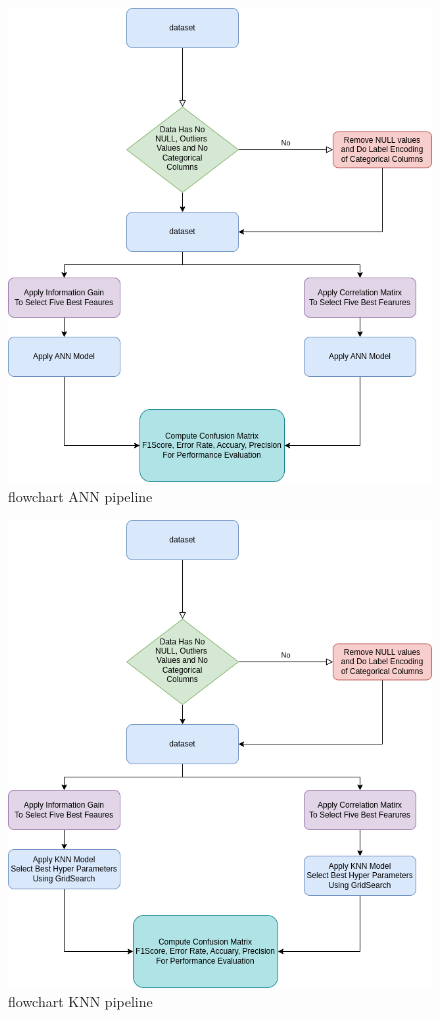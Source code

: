 \documentclass{article}
\begin{document}
\begin{figure}[htbp]
\centering
\includegraphics[scale=0.5]{figures/Ann_model.png}
\caption{flowchart ANN pipeline}
\label{fig:ANN_pipeline}
\end{figure}



\begin{figure}[htbp]
\centering
\includegraphics[scale=0.5]{figures/KNN.png}
\caption{flowchart KNN pipeline}
\label{fig:KNN_pipeline}
\end{figure}
\end{document}
